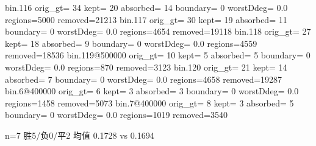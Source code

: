   bin.116    orig_gt= 34 kept= 20 absorbed= 14 boundary= 0 worstDdeg=  0.0 regions=5000 removed=21213
  bin.117    orig_gt= 30 kept= 19 absorbed= 11 boundary= 0 worstDdeg=  0.0 regions=4654 removed=19118
  bin.118    orig_gt= 27 kept= 18 absorbed=  9 boundary= 0 worstDdeg=  0.0 regions=4559 removed=18536
  bin.119@500000 orig_gt= 10 kept=  5 absorbed=  5 boundary= 0 worstDdeg=  0.0 regions=870 removed=3123
  bin.120    orig_gt= 21 kept= 14 absorbed=  7 boundary= 0 worstDdeg=  0.0 regions=4658 removed=19287
  bin.6@400000 orig_gt=  6 kept=  3 absorbed=  3 boundary= 0 worstDdeg=  0.0 regions=1458 removed=5073
  bin.7@400000 orig_gt=  8 kept=  3 absorbed=  5 boundary= 0 worstDdeg=  0.0 regions=1019 removed=3540

  n=7 胜5/负0/平2  均值 0.1728 vs 0.1694
